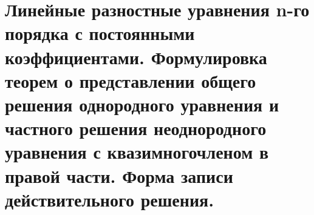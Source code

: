 \section{Линейные разностные уравнения n-го порядка с постоянными коэффициентами. Формулировка теорем о представлении общего решения однородного уравнения и частного решения неоднородного уравнения с квазимногочленом в правой части. Форма записи действительного решения.}
